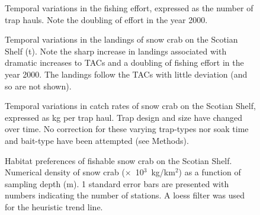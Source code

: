 \documentclass[11pt]{article}
\newcommand*{\D}{.}  %
\newcommand{\sq}{$^2$}
\newcommand{\kmsq}{km\sq}
\newcommand{\Xthou}{$\times$~10$^3$}
\begin{document}


\clearpage

\begin{figure}[]
\begin{center}
\end{center}
\caption{Temporal variations in the fishing effort, expressed as the number of trap hauls. Note the doubling of effort in the year 2000.}
\label{ts.effort}
\end{figure}

\begin{figure}[]
\begin{center}
\end{center}
\caption{Temporal variations in the landings of snow crab on the Scotian Shelf (t). Note the sharp increase in landings associated with dramatic increases to TACs and a doubling of fishing effort in the year 2000. The landings follow the TACs with little deviation (and so are not shown).}
\label{ts.landings}
\end{figure}

\clearpage

\begin{figure}[]
\begin{center}
\end{center}
\caption{Temporal variations in catch rates of snow crab on the Scotian Shelf, expressed as kg per trap haul. Trap design and size have changed over time. No correction for these varying trap-types nor soak time and bait-type have been attempted (see Methods).}
\label{ts.cpue}
\end{figure}

\begin{figure}[]
\begin{center}
\end{center}
\caption{ Habitat preferences of fishable snow crab on the Scotian Shelf. Numerical density of snow crab (\Xthou~kg/\kmsq) as a function of sampling depth (m). 1 standard error bars are presented with numbers indicating the number of stations. A loess filter was used for the heuristic trend line. }
\label{habitattemplate.depth}
\end{figure}

\clearpage
\end{document}
